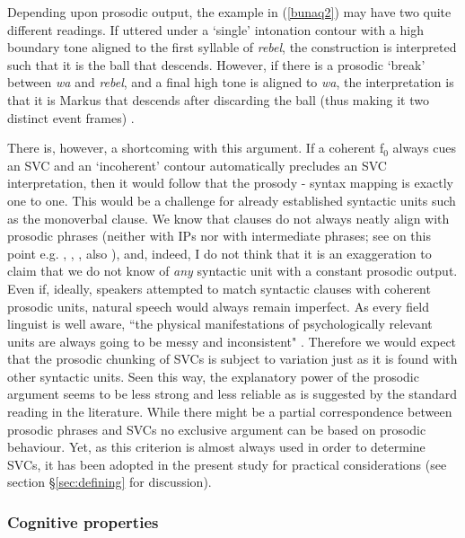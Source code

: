 Depending upon prosodic output, the example in (\ref{bunaq2}) may have two quite different readings. If uttered under a `single' intonation contour with a high boundary tone aligned to the first syllable of \textit{rebel}, the construction is interpreted such that it is the ball that descends. However, if there is a prosodic `break' between \textit{wa} and \textit{rebel}, and a final high tone is aligned to \textit{wa}, the interpretation is that it is Markus that descends after discarding the ball (thus making it two distinct event frames) \citep[442]{schapper2009bunaq}.

There is, however, a shortcoming with this argument. If a coherent f$_0$ always cues an SVC and an `incoherent' contour automatically precludes an SVC interpretation, then it would follow that the prosody - syntax mapping is exactly one to one. This would be a challenge for already established syntactic units such as the monoverbal clause. We know that clauses do not always neatly align with prosodic phrases (neither with \textsc{IP}s nor with intermediate phrases; see on this point e.g. \citealt{chafe1994discourse}, \citealt{himmelmann2006challenges}, \citealt{ladd2008intonational}, also \citealt{engelhardt2010}), and, indeed, I do not think that it is an exaggeration to claim that we do not know of \emph{any} syntactic unit with a constant prosodic output. Even if, ideally, speakers attempted to match syntactic clauses with coherent prosodic units, natural speech would always remain imperfect. As every field linguist is well aware, ``the physical manifestations of psychologically relevant units are always going to be messy and inconsistent" \citep[58]{chafe1994discourse}. Therefore we would expect that the prosodic chunking of SVCs is subject to variation just as it is found with other syntactic units. Seen this way, the explanatory power of the prosodic argument seems to be less strong and less reliable as is suggested by the standard reading in the literature. While there might be a partial correspondence between prosodic phrases and SVCs no exclusive argument can be based on prosodic behaviour. Yet, as this criterion is almost always used in order to determine SVCs, it has been adopted in the present study for practical considerations (see section §\ref{sec:defining} for discussion).

\subsubsection{Cognitive properties} \label{sec:cognitive}

